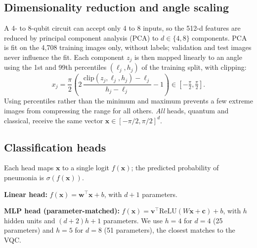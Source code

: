 \documentclass[conference]{IEEEtran}
\begin{document}
\subsection{Dimensionality reduction and angle scaling}
A 4- to 8-qubit circuit can accept only 4 to 8 inputs, so the 512-d
features are reduced by principal component analysis (PCA) to
$d\in\{4,8\}$ components. PCA is fit on the 4{,}708 training images only,
without labels; validation and test images never influence the fit. Each
component $z_j$ is then mapped linearly to an angle using the 1st and 99th
percentiles $(\ell_j,h_j)$ of the training split, with clipping:
\begin{equation}
x_j=\frac{\pi}{2}\left(2\,\frac{\mathrm{clip}(z_j,\ell_j,h_j)-\ell_j}{h_j-\ell_j}-1\right)
\in\left[-\tfrac{\pi}{2},\tfrac{\pi}{2}\right].
\end{equation}
Using percentiles rather than the minimum and maximum prevents a few
extreme images from compressing the range for all others. \emph{All} heads,
quantum and classical, receive the same vector
$\mathbf{x}\in[-\pi/2,\pi/2]^d$.

\subsection{Classification heads}
Each head maps $\mathbf{x}$ to a single logit $f(\mathbf{x})$; the
predicted probability of pneumonia is $\sigma(f(\mathbf{x}))$.

\textbf{Linear head:} $f(\mathbf{x})=\mathbf{w}^\top\mathbf{x}+b$, with $d+1$
parameters.

\textbf{MLP head (parameter-matched):}
$f(\mathbf{x})=\mathbf{v}^\top\mathrm{ReLU}(W\mathbf{x}+\mathbf{c})+b$,
with $h$ hidden units and $(d+2)h+1$ parameters. We use $h=4$ for $d=4$
(25 parameters) and $h=5$ for $d=8$ (51 parameters), the closest matches to
the VQC.
\end{document}
